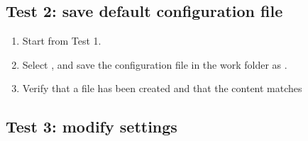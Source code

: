 \subsection{Test 2: save default configuration file}
\begin{enumerate}
\item Start from Test 1.
\item Select  \textrightarrow {}, and save the configuration file in the work folder as .
\item Verify that a file  has been created and that the content matches

\end{enumerate}

\subsection{Test 3: modify settings}
